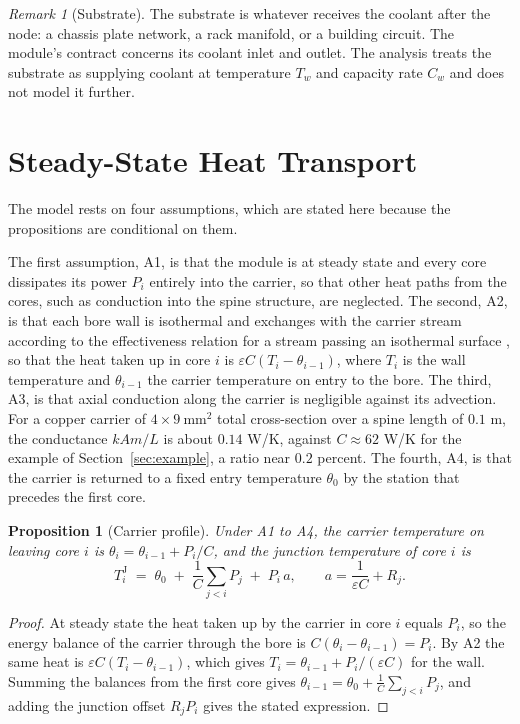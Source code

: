 \documentclass[11pt]{article}
\theoremstyle{definition}
\theoremstyle{plain}
\newtheorem{proposition}{Proposition}[section]
\theoremstyle{remark}
\newtheorem{remark}{Remark}[section]
\begin{document}
\begin{remark}[Substrate]
The substrate is whatever receives the coolant after the node: a chassis plate network, a rack manifold, or a building circuit. The module's contract concerns its coolant inlet and outlet. The analysis treats the substrate as supplying coolant at temperature $T_w$ and capacity rate $C_w$ and does not model it further.
\end{remark}

\section{Steady-State Heat Transport}
\label{sec:model}

The model rests on four assumptions, which are stated here because the propositions are conditional on them.

The first assumption, A1, is that the module is at steady state and every core dissipates its power $P_i$ entirely into the carrier, so that other heat paths from the cores, such as conduction into the spine structure, are neglected. The second, A2, is that each bore wall is isothermal and exchanges with the carrier stream according to the effectiveness relation for a stream passing an isothermal surface \cite{kayslondon}, so that the heat taken up in core $i$ is $\varepsilon C(T_i-\theta_{i-1})$, where $T_i$ is the wall temperature and $\theta_{i-1}$ the carrier temperature on entry to the bore. The third, A3, is that axial conduction along the carrier is negligible against its advection. For a copper carrier of $4\times 9\ \mathrm{mm}^2$ total cross-section over a spine length of $0.1$ m, the conductance $kAm/L$ is about $0.14$ W/K, against $C\approx 62$ W/K for the example of Section~\ref{sec:example}, a ratio near $0.2$ percent. The fourth, A4, is that the carrier is returned to a fixed entry temperature $\theta_0$ by the station that precedes the first core.

\begin{proposition}[Carrier profile]\label{prop:profile}
Under A1 to A4, the carrier temperature on leaving core $i$ is $\theta_i=\theta_{i-1}+P_i/C$, and the junction temperature of core $i$ is
\[
T^{\mathrm{J}}_i \;=\; \theta_0 \;+\; \frac1C\sum_{j<i}P_j \;+\; P_i\,a,
\qquad a=\frac{1}{\varepsilon C}+R_j .
\]
\end{proposition}
\begin{proof}
At steady state the heat taken up by the carrier in core $i$ equals $P_i$, so the energy balance of the carrier through the bore is $C(\theta_i-\theta_{i-1})=P_i$. By A2 the same heat is $\varepsilon C(T_i-\theta_{i-1})$, which gives $T_i=\theta_{i-1}+P_i/(\varepsilon C)$ for the wall. Summing the balances from the first core gives $\theta_{i-1}=\theta_0+\frac1C\sum_{j<i}P_j$, and adding the junction offset $R_jP_i$ gives the stated expression.
\end{proof}
\end{document}
